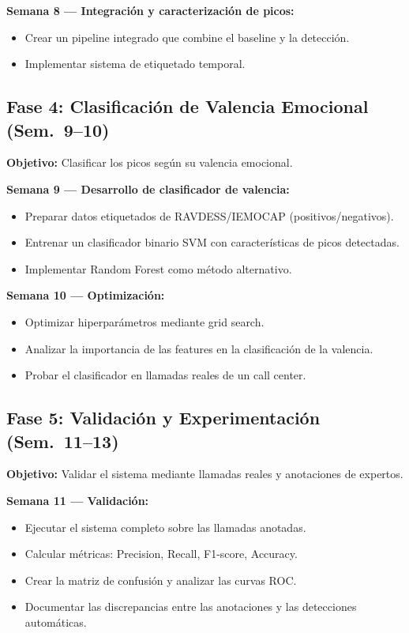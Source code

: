 \textbf{Semana 8 — Integración y caracterización de picos:}
\begin{itemize}
    \item Crear un pipeline integrado que combine el baseline y la detección.
    \item Implementar sistema de etiquetado temporal.
\end{itemize}

\subsection{Fase 4: Clasificación de Valencia Emocional (Sem.\ 9--10)}

\textbf{Objetivo:} Clasificar los picos según su valencia emocional.

\textbf{Semana 9 — Desarrollo de clasificador de valencia:}
\begin{itemize}
    \item Preparar datos etiquetados de RAVDESS/IEMOCAP (positivos/negativos).
    \item Entrenar un clasificador binario SVM con características de picos detectadas.
    \item Implementar Random Forest como método alternativo.
\end{itemize}

\textbf{Semana 10 — Optimización:}
\begin{itemize}
    \item Optimizar hiperparámetros mediante grid search.
    \item Analizar la importancia de las features en la clasificación de la valencia.
    \item Probar el clasificador en llamadas reales de un call center.
\end{itemize}

\subsection{Fase 5: Validación y Experimentación (Sem.\ 11--13)}

\textbf{Objetivo:} Validar el sistema mediante llamadas reales y anotaciones de
expertos.

\textbf{Semana 11 — Validación:}
\begin{itemize}
    \item Ejecutar el sistema completo sobre las llamadas anotadas.
    \item Calcular métricas: Precision, Recall, F1-score, Accuracy.
    \item Crear la matriz de confusión y analizar las curvas ROC.
    \item Documentar las discrepancias entre las anotaciones y las detecciones
          automáticas.
\end{itemize}

